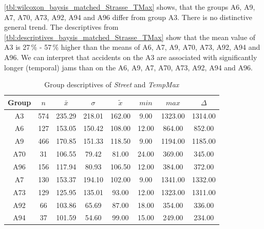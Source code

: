 \autoref{tbl:wilcoxon_baysis_matched_Strasse_TMax} shows, that the groups A6, A9, A7, A70, A73, A92, A94 and A96 differ from group A3. There is no distinctive general trend. The descriptives from \autoref{tbl:descriptives_baysis_matched_Strasse_TMax} show that the mean value of A3 is 27\,\% - 57\,\% higher than the means of A6, A7, A9, A70, A73, A92, A94 and A96. We can interpret that accidents on the A3 are associated with significantly longer (temporal) jams than on the A6, A9, A7, A70, A73, A92, A94 and A96.
\begin{table}[ht]
	\tiny
	\centering
	\begin{tabular}{c|c|c|c|c|c|c|c}
		\toprule
		Group & $n$ & $\bar{x}$ & $\sigma$ & $\tilde{x}$ & $min$ & $max$ & $\Delta$ \\ 
		\midrule
		A3 & 574 & 235.29 & 218.01 & 162.00 & 9.00 & 1323.00 & 1314.00   \\ 
		A6 & 127 & 153.05 & 150.42 & 108.00 & 12.00 & 864.00 & 852.00   \\ 
		A9 & 466 & 170.85 & 151.33 & 118.50 & 9.00 & 1194.00 & 1185.00   \\ 
		A70 & 31 & 106.55 & 79.42 & 81.00 & 24.00 & 369.00 & 345.00   \\ 
		A96 & 156 & 117.94 & 80.93 & 106.50 & 12.00 & 384.00 & 372.00   \\ 
		A7 & 130 & 153.37 & 194.10 & 102.00 & 9.00 & 1341.00 & 1332.00  \\ 
		A73 & 129 & 125.95 & 135.01 & 93.00 & 12.00 & 1323.00 & 1311.00  \\ 
		A92 & 66 & 103.86 & 65.69 & 87.00 & 18.00 & 354.00 & 336.00 \\ 
		A94 & 37 & 101.59 & 54.60 & 99.00 & 15.00 & 249.00 & 234.00 \\ 
 		\bottomrule
	\end{tabular}
	\caption{Group descriptives of \textit{Street} and \textit{TempMax}}
	\label{tbl:descriptives_baysis_matched_Strasse_TMax}
\end{table}

